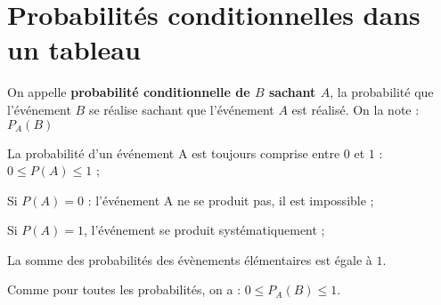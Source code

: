 \documentclass[11pt]{article}
\begin{document}
\section{Probabilités conditionnelles dans un tableau}

\begin{definition}
On appelle \textbf{probabilité conditionnelle de $B$ sachant $A$}, la
probabilité que l'événement $B$ se réalise sachant que l'événement $A$
est réalisé. On la note : $P_A(B)$
\end{definition}


\begin{rappel}
  \begin{enuspaced}
  \item La probabilité d'un événement A est toujours comprise entre
    $0$ et $1$ : $0 \leq P(A) \leq 1$ ;
  \item Si $P(A) = 0$ : l'événement A ne se produit pas, il
    est impossible ;  
  \item Si $P(A) = 1$, l'événement se produit
    systématiquement ;  
  \item La somme des probabilités des évènements
    élémentaires est égale à $1$.
  \end{enuspaced}
\end{rappel}

\begin{remarque}
  Comme pour toutes les probabilités, on a : $0 \leq P_A(B) \leq 1$.
\end{remarque}
\end{document}
